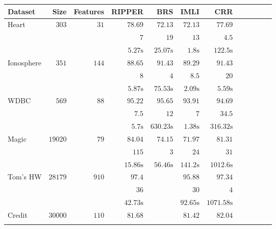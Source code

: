 \begin{table}[b]
	\setlength{\tabcolsep}{3pt}
	\scriptsize 
	\begin{center}
		\begin{tabular}{l  r  r r r r r r r rrr}
			\toprule
			{{Dataset}} & Size & Features  & RIPPER & BRS & IMLI & CRR\\
			\midrule
			{ Heart}   & $  303 $  & $  31 $  & $   78.69  $    & $   72.13  $    & $   72.13  $    & $   77.69  $   \\[0.05cm] & & 
			& $   7 $    & $   19 $    & $   13 $    & $   4.5  $   \\[0.05cm] & & 
			& $   5.27 \text{s}  $    & $   25.07 \text{s}  $    & $   1.8 \text{s}  $    & $   122.5 \text{s}  $   \\[.3cm] 
			{ Ionosphere}   & $  351 $  & $  144 $  & $   88.65  $    & $   91.43  $    & $   89.29  $    & $   91.43  $   \\[0.05cm] & & 
			& $   8 $    & $   4 $    & $   8.5  $    & $   20 $   \\[0.05cm] & & 
			& $   5.87 \text{s}  $    & $   75.53 \text{s}  $    & $   2.09 \text{s}  $    & $   5.59 \text{s}  $   \\[.3cm] 
			{ WDBC}   & $  569 $  & $  88 $  & $   95.22  $    & $   95.65  $    & $   93.91  $    & $   94.69  $   \\[0.05cm] & & 
			& $   7.5  $    & $   12 $    & $   7 $    & $   34.5  $   \\[0.05cm] & & 
			& $   5.7 \text{s}  $    & $   630.23 \text{s}  $    & $   1.38 \text{s}  $    & $   316.32 \text{s}  $   \\[.3cm] 
			{ Magic}   & $  19020 $  & $  79 $  & $   84.04  $    & $   74.15  $    & $   71.97  $    & $   81.31  $   \\[0.05cm] & & 
			& $   115 $    & $   3 $    & $   24 $    & $   31 $   \\[0.05cm] & & 
			& $   15.86 \text{s}  $    & $   56.46 \text{s}  $    & $   141.2 \text{s}  $    & $   1012.6 \text{s}  $   \\[.3cm] 
			{ Tom's HW}   & $  28179 $  & $  910 $  & $   97.4  $    &   \multicolumn{1}{c}{\multirow{3}{*}{\textemdash}}       & $   95.88  $    & $   97.34  $   \\[0.05cm] & & 
			& $   36 $    &       & $   30 $    & $   4 $   \\[0.05cm] & & 
			& $   42.73 \text{s}  $    &       & $   92.65 \text{s}  $    & $   1071.58 \text{s}  $   \\[.3cm] 
			{ Credit}   & $  30000 $  & $  110 $  & $   81.68  $    &   \multicolumn{1}{c}{\multirow{3}{*}{\textemdash}}       & $   81.42  $    & $   82.04  $   \\[0.05cm] & & 

\end{tabular}
\end{center}
\end{table}
